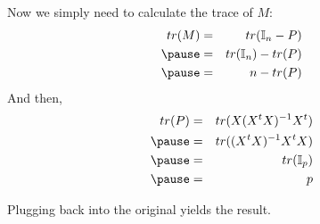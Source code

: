 \begin{frame}[fragile] \frametitle{}

Now we simply need to calculate the trace of $M$:
\begin{eqnarray*}
tr(M) &=& tr(\mathbb{I}_n - P) \\ \pause
&=& tr(\mathbb{I}_n) - tr(P) \\ \pause
&=& n - tr(P)
\end{eqnarray*}
\pause And then,
\begin{eqnarray*}
tr(P) &=& tr(X (X^t X)^{-1} X^t) \\ \pause
&=& tr((X^t X)^{-1} X^t X) \\ \pause
&=& tr( \mathbb{I}_p ) \\ \pause
&=& p
\end{eqnarray*}

\pause Plugging back into the original yields the result.

\end{frame}














